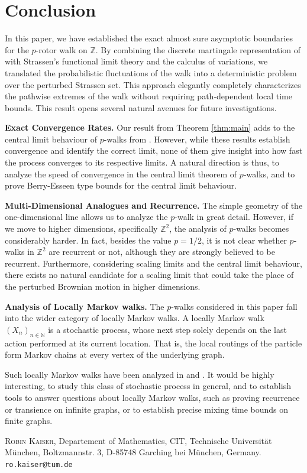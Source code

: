 \documentclass[11pt]{article}
\theoremstyle{remark}
\newcommand{\N}{\mathbb{N}}
\newcommand{\Z}{\mathbb{Z}}
\begin{document}
\section{Conclusion}
In this paper, we have established the exact almost sure asymptotic boundaries for the $p$-rotor walk on $\mathbb{Z}$. By combining the discrete martingale representation of \cite{HLSH18} with Strassen’s functional limit theory and the calculus of variations, we translated the probabilistic fluctuations of the walk into a deterministic problem over the perturbed Strassen set. This approach elegantly completely characterizes the pathwise extremes of the walk without requiring path-dependent local time bounds. This result opens several natural avenues for future investigations.

\textbf{Exact Convergence Rates.} Our result from Theorem \ref{thm:main} adds to the central limit behaviour of $p$-walks from \cite{HLSH18}. However, while these results establish convergence and identify the correct limit, none of them give insight into how fast the process converges to its respective limits. A natural direction is thus, to analyze the speed of convergence in the central limit theorem of $p$-walks, and to prove Berry-Esseen type bounds for the central limit behaviour.

\textbf{Multi-Dimensional Analogues and Recurrence.} The simple geometry of the one-dimensional line allows us to analyze the $p$-walk in great detail. However, if we move to higher dimensions, specifically $\Z^2$, the analysis of $p$-walks becomes considerably harder. In fact, besides the value $p=1/2$, it is not clear whether $p$-walks in $\Z^2$ are recurrent or not, although they are strongly believed to be recurrent. Furthermore, considering scaling limits and the central limit behaviour, there exists no natural candidate for a scaling limit that could take the place of the perturbed Brownian motion in higher dimensions.

\textbf{Analysis of Locally Markov walks.} The $p$-walks considered in this paper fall into the wider category of locally Markov walks. A locally Markov walk $(X_n)_{n\in\N}$ is a stochastic process, whose next step solely depends on the last action performed at its current location. That is, the local routings of the particle form Markov chains at every vertex of the underlying graph.

Such locally Markov walks have been analyzed in \cite{CGLP21} and \cite{KLSH26}. It would be highly interesting, to study this class of stochastic process in general, and to establish tools to answer questions about locally Markov walks, such as proving recurrence or transience on infinite graphs, or to  establish precise mixing time bounds on finite graphs.




\textsc{Robin Kaiser}, Departement of Mathematics, CIT, Technische Universität München, Boltzmannstr. 3, D-85748 Garching bei München, Germany. \texttt{ro.kaiser@tum.de}
\end{document}
